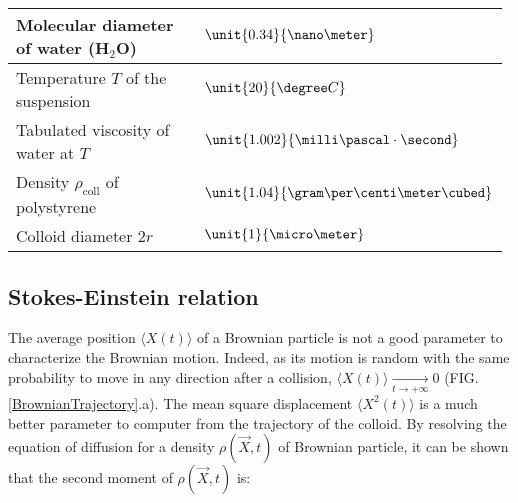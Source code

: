 \documentclass[%
 aip,
 jmp,%
 amsmath,amssymb,
reprint,%
]{revtex4-1}
\begin{document}
\begin{table}[H]
\begin{tabular}{|m{0.7\linewidth}|m{0.28\linewidth}|}
  \hline
  \vspace{1mm}
  Molecular diameter of water (H$_2$O) \citep{17_marcus1998properties}  & \vspace{2mm} $\unit{0.34}{\nano\meter}$ \vspace{1mm}  \\
  \hline
  \vspace{1mm}
  Temperature $T$ of the suspension & \vspace{2mm} $\unit{20}{\degree C}$ \vspace{1mm} \\
  \hline
  \vspace{1mm}
 Tabulated viscosity of water at $T$ & \vspace{2mm} $\unit{1.002}{\milli\pascal\cdot\second}$ \vspace{1mm} \\
  \hline
  \vspace{1mm}
  Density $\rho_\text{coll}$ of polystyrene & \vspace{2mm} $\unit{1.04}{\gram\per\centi\meter\cubed}$ \vspace{1mm} \\
  \hline
  \vspace{1mm}
 Colloid diameter $2r$ & \vspace{2mm} $\unit{1}{\micro\meter}$ \vspace{1mm} \\
  \hline
  \end{tabular}
  \label{TabParams}
\end{table}


\subsection{Stokes-Einstein relation}

The average position $\langle X(t) \rangle$ of a Brownian particle is not a good parameter to characterize the Brownian motion. Indeed, as its motion is random with the same probability to move in any direction after a collision, $\langle X(t) \rangle \underset{t\to +\infty}{\longrightarrow} 0$ (FIG. \ref{BrownianTrajectory}.a). The mean square displacement \citep{11_ken2003molecular} $\langle X^2(t) \rangle$ is a much better parameter to computer from the trajectory of the colloid. By resolving the equation of diffusion for a density $\rho(\vec{X}, t)$ of Brownian particle, it can be shown that the second moment of $\rho(\vec{X}, t)$ is:
\end{document}
